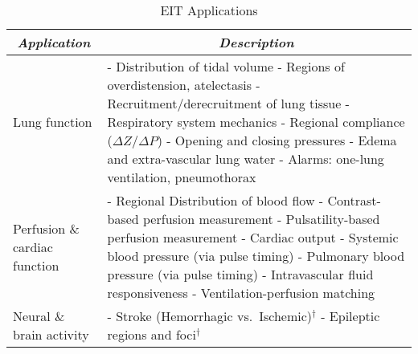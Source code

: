 \documentclass[10pt,journal]{IEEEtran}\def\TBLWIDA{15mm}\def\TBLWIDB{60mm}
\begin{document}
\begin{table}
\caption{EIT Applications}
\label{tbl:EIT_Applications}
\centering
\begin{tabular}{p{\TBLWIDA}p{\TBLWIDB}}
\multicolumn{1}{c}{\em Application} &
\multicolumn{1}{c}{\em Description} \\
\hline
Lung function &
 - Distribution of tidal volume \cite{Hahn1995Distribution}
      \newline
 - Regions of overdistension, atelectasis
                \cite{Gomez2012Overdistension, Costa2009Bedside}
      \newline
 - Recruitment/derecruitment of lung tissue \cite{Frerichs2003Regional}
      \newline
 - Respiratory system mechanics \cite{Pulletz2012Dynamics}
      \newline
 - Regional compliance ($\Delta Z/\Delta P$) 
      \newline
 - Opening and closing pressures \cite{Pulletz2012Opening}
      \newline
 - Edema and extra-vascular lung water \cite{Trepte2016Edema}
      \newline
 - Alarms: one-lung ventilation, pneumothorax 
\\
    \hline
Perfusion  \& \newline
cardiac \newline function & 
 - Regional Distribution of blood flow \cite{Smit2003Perfusion}
      \newline
 - Contrast-based perfusion measurement \cite{Frerichs2002Perfusion}
      \newline
 - Pulsatility-based perfusion measurement \cite{Smit2003Perfusion}
      \newline
 - Cardiac output 
      \newline
 - Systemic blood pressure  (via pulse timing) \cite{Sola2011Central}
      \newline
 - Pulmonary blood pressure (via pulse timing) \cite{Proenca2016Noninvasive}
      \newline
 - Intravascular fluid responsiveness \cite{Trepte2017StrokeVolume}
      \newline
 - Ventilation-perfusion matching 
\\
    \hline
Neural \& \newline
brain activity &
 - Stroke (Hemorrhagic vs.\ Ischemic)$^\dagger$ \cite{Romsauerova2006mfEIT}
      \newline
 - Epileptic regions and foci$^\dagger$ 
      \newline

\end{tabular}
\end{table}
\end{document}
